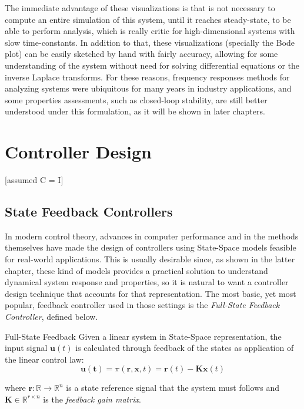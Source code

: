 \documentclass[a4paper,11pt]{book}
\numberwithin{figure}{chapter}
\numberwithin{equation}{chapter}
\numberwithin{table}{chapter}
\theoremstyle{definition}
\newtheorem{definition}{Definition}[chapter]
\newcounter{boxed-theorem}
\newcounter{boxed-definition}
\newenvironment{boxed-definition}[1]
{\begin{shaded} \begin{definition}{#1}}
{\end{definition} \end{shaded}}
\begin{document}
The immediate advantage of these visualizations is that is not necessary to compute an entire simulation of this system, until it reaches steady-state, to be able to perform analysis, which is really critic for high-dimensional systems with slow time-constants. In addition to that, these visualizations (specially the Bode plot) can be easily sketched by hand with fairly accuracy, allowing for some understanding of the system without need for solving differential equations or the inverse Laplace transforms. For these reasons, frequency responses methods for analyzing systems were ubiquitous for many years in industry applications, and some properties assessments, such as closed-loop stability, are still better understood under this formulation, as it will be shown in later chapters.

\clearpage
\chapter{Controller Design}

[assumed C = I]

\section{State Feedback Controllers}

In modern control theory, advances in computer performance and in the methods themselves have made the design of controllers using State-Space models feasible for real-world applications. This is usually desirable since, as shown in the latter chapter, these kind of models provides a practical solution to understand dynamical system response and properties, so it is natural to want a controller design technique that accounts for that representation. The most basic, yet most popular, feedback controller used in those settings is the \textit{Full-State Feedback Controller}, defined below. 

\begin{boxed-definition}{Full-State Feedback}
	Given a linear system in State-Space representation, the input signal $\bm{u}(t)$ is calculated through feedback of the states as application of the linear control law:
	\begin{equation}
		\bm{u(t)} = \pi(\bm{r}, \bm{x}, t) = \bm{r}(t) - \bm{K} \bm{x}(t)
	\end{equation}
	
	\noindent where $\bm{r} : \mathbb{R} \rightarrow \mathbb{R}^{n}$ is a state reference signal that the system must follows and $\bm{K} \in \mathbb{R}^{r \times n}$ is the \textit{feedback gain matrix}.
\end{boxed-definition}
\end{document}
